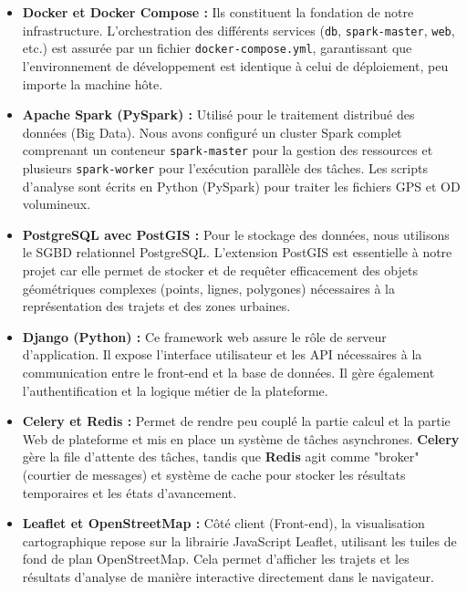 \documentclass[french]{tai_info} %
\begin{document}
\begin{itemize}
    \item \textbf{Docker et Docker Compose :} 
    Ils constituent la fondation de notre infrastructure. L'orchestration des différents services (\texttt{db}, \texttt{spark-master}, \texttt{web}, etc.) est assurée par un fichier \texttt{docker-compose.yml}, garantissant que l'environnement de développement est identique à celui de déploiement, peu importe la machine hôte.
    
    \item \textbf{Apache Spark (PySpark) :} 
    Utilisé pour le traitement distribué des données (Big Data). Nous avons configuré un cluster Spark complet comprenant un conteneur \texttt{spark-master} pour la gestion des ressources et plusieurs \texttt{spark-worker} pour l'exécution parallèle des tâches. Les scripts d'analyse sont écrits en Python (PySpark) pour traiter les fichiers GPS et OD volumineux.
    
    \item \textbf{PostgreSQL avec PostGIS :} 
    Pour le stockage des données, nous utilisons le SGBD relationnel PostgreSQL. L'extension PostGIS est essentielle à notre projet car elle permet de stocker et de requêter efficacement des objets géométriques complexes (points, lignes, polygones) nécessaires à la représentation des trajets et des zones urbaines.
    
    \item \textbf{Django (Python) :} 
    Ce framework web assure le rôle de serveur d'application. Il expose l'interface utilisateur et les API nécessaires à la communication entre le front-end et la base de données. Il gère également l'authentification et la logique métier de la plateforme.
    
    \item \textbf{Celery et Redis :} 
    Permet de rendre peu couplé la partie calcul et la partie Web de plateforme et mis en place un système de tâches asynchrones. \textbf{Celery} gère la file d'attente des tâches, tandis que \textbf{Redis} agit comme "broker" (courtier de messages) et système de cache pour stocker les résultats temporaires et les états d'avancement.
    
    \item \textbf{Leaflet et OpenStreetMap :} 
    Côté client (Front-end), la visualisation cartographique repose sur la librairie JavaScript Leaflet, utilisant les tuiles de fond de plan OpenStreetMap. Cela permet d'afficher les trajets et les résultats d'analyse de manière interactive directement dans le navigateur.
    
\end{itemize}
\end{document}
